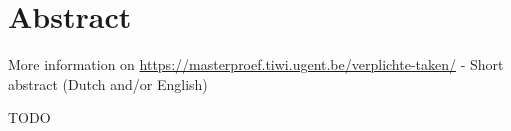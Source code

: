 \chapter*{Abstract}

More information on \href{https://masterproef.tiwi.ugent.be/verplichte-taken/}{https://masterproef.tiwi.ugent.be/verplichte-taken/} - Short abstract (Dutch and/or English)

TODO